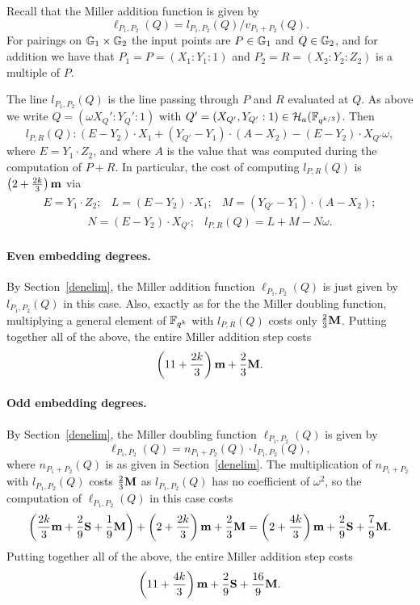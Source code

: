 Recall that the Miller addition function is given by
\[\ell_{P_1,P_2}(Q) = l_{P_1,P_2}(Q)/v_{P_1 + P_2}(Q).\]
For pairings on $\mathbb{G}_{1} \times \mathbb{G}_{2}$ the input points are $P \in \mathbb{G}_{1}$ and
$Q \in \mathbb{G}_{2}$, and for addition we have that
 $P_1  = P = (X_1:Y_1:1)$ and $P_2 = R = (X_2:Y_2:Z_2)$ is a multiple of $P$.
 
The line $l_{P_1,P_2}(Q)$ is the line passing through $P$ and $R$ evaluated at $Q$.
As above we write $Q = (\omega X_Q':Y_Q':1)$ with
$Q' = (X_{Q'},Y_{Q'}:1) \in \mathcal{H}_a(\mathbb{F}_{q^{k/3}})$.
Then
$$l_{P,R}(Q): (E - Y_2) \cdot X_1 + (Y_{Q'} - Y_1) \cdot (A - X_2) - (E - Y_2) \cdot X_{Q'}\omega,  $$
where $E = Y_1 \cdot Z_2$, and where $A$ is the value that was computed during the computation of $P+R$.
In particular, the cost of computing $l_{P,R}(Q)$ is $\left(2 + \frac{2k}{3}\right)\textbf{m}$ via
\[\begin{array}{ccc}
E = Y_1 \cdot Z_2; & L = (E-Y_2)\cdot X_1; 
& M = (Y_{Q'} - Y_1) \cdot (A - X_2); 
\end{array}\]
\[\begin{array}{cc}
N = (E - Y_2) \cdot X_{Q'}; &
l_{P,R}(Q) = L + M - N\omega.
\end{array}\]

\paragraph*{Even embedding degrees.}

By Section~\ref{denelim}, the Miller addition function $\ell_{P_1,P_2}(Q)$ is just given by $l_{P_1,P_2}(Q)$ in this case. 
Also, exactly as for the the Miller doubling function, multiplying a general element of $\mathbb{F}_{q^k}$ with $l_{P,R}(Q)$ costs only
$\frac{2}{3}\textbf{M}$.
Putting together all of the above, the entire Miller addition step costs
\[\left(11 + \frac{2k}{3}\right)\textbf{m} + \frac{2}{3}\textbf{M}.\]

\paragraph*{Odd embedding degrees.}

By Section~\ref{denelim}, the Miller doubling function $\ell_{P_1,P_2}(Q)$ is given by
\[\ell_{P_1,P_2}(Q) = n_{P_1+P_2}(Q) \cdot l_{P_1,P_2}(Q),\]
where $n_{P_1+P_2}(Q)$ is as given in Section~\ref{denelim}.
The multiplication of $n_{P_1+P_2}$ with $l_{P_1,P_2}(Q)$ costs
$\frac{2}{3}\textbf{M}$ as $l_{P_1,P_2}(Q)$ has no coefficient of $\omega^2$,
so the computation of $\ell_{P_1,P_2}(Q)$ in this case costs
\[\left( \frac{2k}{3}\textbf{m} + \frac{2}{9}\textbf{S} + \frac{1}{9}\textbf{M}\right) 
+\left(2 + \frac{2k}{3}\right)\textbf{m} 
+\frac{2}{3}\textbf{M}
=\left(2 + \frac{4k}{3}\right)\textbf{m} + \frac{2}{9}\textbf{S} + \frac{7}{9}\textbf{M}.\]
Putting together all of the above, the entire Miller addition step costs
\[\left(11 + \frac{4k}{3}\right)\textbf{m} + \frac{2}{9}\textbf{S} + \frac{16}{9}\textbf{M}.\]

